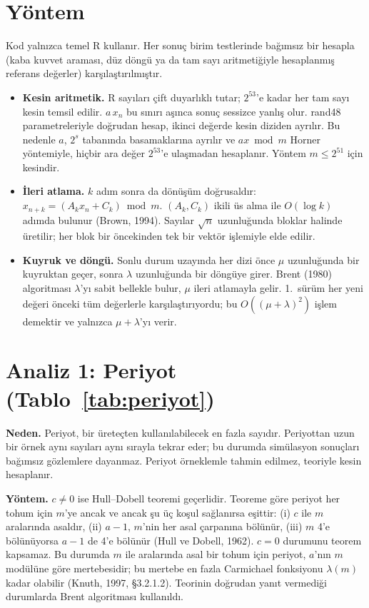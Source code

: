 \documentclass[11pt,a4paper]{article}
\begin{document}
\section{Yöntem}

Kod yalnızca temel R kullanır. Her sonuç birim testlerinde bağımsız bir hesapla (kaba kuvvet araması, düz döngü ya da tam sayı
aritmetiğiyle hesaplanmış referans değerler) karşılaştırılmıştır.

\begin{itemize}
  \item \textbf{Kesin aritmetik.} R sayıları çift duyarlıklı tutar; $2^{53}$'e kadar her tam sayı kesin temsil edilir. $a\,x_n$
  bu sınırı aşınca sonuç sessizce yanlış olur. rand48 parametreleriyle doğrudan hesap, ikinci değerde kesin diziden ayrılır. Bu
  nedenle $a$, $2^s$ tabanında basamaklarına ayrılır ve $a x \bmod m$ Horner yöntemiyle, hiçbir ara değer $2^{53}$'e ulaşmadan
  hesaplanır. Yöntem $m \le 2^{51}$ için kesindir.
  \item \textbf{İleri atlama.} $k$ adım sonra da dönüşüm doğrusaldır: $x_{n+k} = (A_k x_n + C_k) \bmod m$. $(A_k, C_k)$ ikili
  üs alma ile $O(\log k)$ adımda bulunur (Brown, 1994). Sayılar $\sqrt{n}$ uzunluğunda bloklar halinde üretilir; her blok bir
  öncekinden tek bir vektör işlemiyle elde edilir.
  \item \textbf{Kuyruk ve döngü.} Sonlu durum uzayında her dizi önce $\mu$ uzunluğunda bir kuyruktan geçer, sonra $\lambda$
  uzunluğunda bir döngüye girer. Brent (1980) algoritması $\lambda$'yı sabit bellekle bulur, $\mu$ ileri atlamayla gelir. 1.\
  sürüm her yeni değeri önceki tüm değerlerle karşılaştırıyordu; bu $O((\mu+\lambda)^2)$ işlem demektir ve yalnızca
  $\mu+\lambda$'yı verir.
\end{itemize}

\section{Analiz 1: Periyot (Tablo~\ref{tab:periyot})}

\textbf{Neden.} Periyot, bir üreteçten kullanılabilecek en fazla sayıdır. Periyottan uzun bir örnek aynı sayıları aynı sırayla
tekrar eder; bu durumda simülasyon sonuçları bağımsız gözlemlere dayanmaz. Periyot örneklemle tahmin edilmez, teoriyle kesin
hesaplanır.

\textbf{Yöntem.} $c \ne 0$ ise Hull--Dobell teoremi geçerlidir. Teoreme göre periyot her tohum için $m$'ye ancak ve ancak şu üç
koşul sağlanırsa eşittir: (i) $c$ ile $m$ aralarında asaldır, (ii) $a-1$, $m$'nin her asal çarpanına bölünür, (iii) $m$ 4'e
bölünüyorsa $a-1$ de 4'e bölünür (Hull ve Dobell, 1962). $c=0$ durumunu teorem kapsamaz. Bu durumda $m$ ile aralarında asal
bir tohum için periyot, $a$'nın $m$ modülüne göre mertebesidir; bu mertebe en fazla Carmichael fonksiyonu $\lambda(m)$ kadar
olabilir (Knuth, 1997, §3.2.1.2). Teorinin doğrudan yanıt vermediği durumlarda Brent algoritması kullanıldı.
\end{document}
